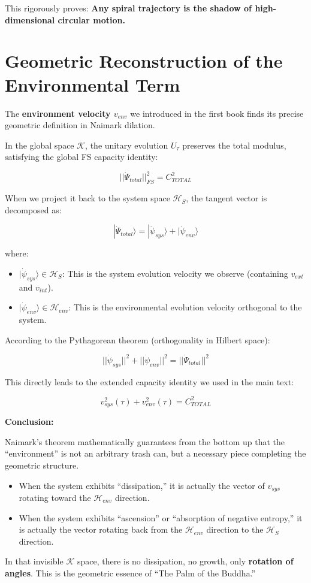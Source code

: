 This rigorously proves: \textbf{Any spiral trajectory is the shadow of high-dimensional circular motion.}

\section{Geometric Reconstruction of the Environmental Term}

The \textbf{environment velocity $v_{env}$} we introduced in the first book finds its precise geometric definition in Naimark dilation.

In the global space $\mathcal{K}$, the unitary evolution $U_\tau$ preserves the total modulus, satisfying the global FS capacity identity:

\[||\dot{\Psi}_{total}||_{FS}^2 = C_{TOTAL}^2\]

When we project it back to the system space $\mathcal{H}_S$, the tangent vector is decomposed as:

\[|\dot{\Psi}_{total}\rangle = |\dot{\psi}_{sys}\rangle + |\dot{\psi}_{env}\rangle\]

where:

\begin{itemize}
\item \textbf{$|\dot{\psi}_{sys}\rangle \in \mathcal{H}_S$}: This is the system evolution velocity we observe (containing $v_{ext}$ and $v_{int}$).

\item \textbf{$|\dot{\psi}_{env}\rangle \in \mathcal{H}_{env}$}: This is the environmental evolution velocity orthogonal to the system.
\end{itemize}

According to the Pythagorean theorem (orthogonality in Hilbert space):

\[||\dot{\psi}_{sys}||^2 + ||\dot{\psi}_{env}||^2 = ||\dot{\Psi}_{total}||^2\]

This directly leads to the extended capacity identity we used in the main text:

\[v_{sys}^2(\tau) + v_{env}^2(\tau) = C_{TOTAL}^2\]

\textbf{Conclusion:}

Naimark's theorem mathematically guarantees from the bottom up that the ``environment'' is not an arbitrary trash can, but a necessary piece completing the geometric structure.

\begin{itemize}
\item When the system exhibits ``dissipation,'' it is actually the vector of $v_{sys}$ rotating toward the $\mathcal{H}_{env}$ direction.

\item When the system exhibits ``ascension'' or ``absorption of negative entropy,'' it is actually the vector rotating back from the $\mathcal{H}_{env}$ direction to the $\mathcal{H}_S$ direction.
\end{itemize}

In that invisible $\mathcal{K}$ space, there is no dissipation, no growth, only \textbf{rotation of angles}. This is the geometric essence of ``The Palm of the Buddha.''

